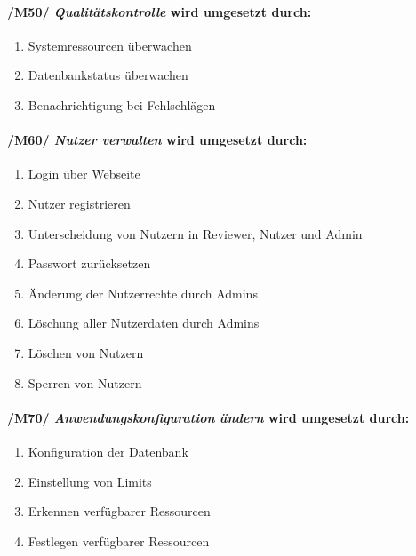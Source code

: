 \paragraph{/M50/ \textit{Qualitätskontrolle} wird umgesetzt durch:}

\begin{enumerate}
    \setlength\itemsep{-1em}
    \setcounter{enumi}{\value{FAs}}
    \item Systemressourcen überwachen %
    \item Datenbankstatus überwachen
    \item Benachrichtigung bei Fehlschlägen
    \setcounter{FAs}{\value{enumi}}
\end{enumerate}
    
\paragraph{/M60/ \textit{Nutzer verwalten} wird umgesetzt durch:}

\begin{enumerate}
    \setlength\itemsep{-1em}
    \setcounter{enumi}{\value{FAs}}
    \item Login über Webseite
    \item Nutzer registrieren
    \item Unterscheidung von Nutzern in \gls{Reviewer}, \gls{Nutzer} und \gls{Admin}
    \item Passwort zurücksetzen
    \item Änderung der Nutzerrechte durch \glspl{Admin}
    \item Löschung aller Nutzerdaten durch \glspl{Admin}
    \item Löschen von Nutzern
    \item Sperren von Nutzern %
    \setcounter{FAs}{\value{enumi}}
\end{enumerate}
    
\paragraph{/M70/ \textit{Anwendungskonfiguration ändern} wird umgesetzt durch:}

\begin{enumerate}
    \setlength\itemsep{-1em}
    \setcounter{enumi}{\value{FAs}}
    \item Konfiguration der Datenbank
    \item Einstellung von Limits %
    \item Erkennen verfügbarer Ressourcen
    \item Festlegen verfügbarer Ressourcen
\end{enumerate}